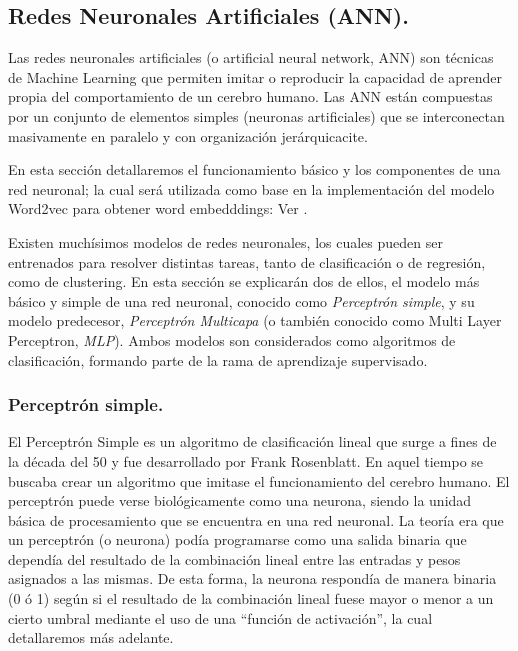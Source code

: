 \documentclass[12pt,a4paper]{article}
\begin{document}
\begin{sloppypar}
\cleardoublepage
\subsection{Redes Neuronales Artificiales (ANN).}\label{ann_teoria}

Las redes neuronales artificiales (o artificial neural network, ANN) son técnicas de Machine Learning que permiten imitar o reproducir la capacidad de aprender propia del comportamiento de un cerebro humano. Las ANN están compuestas por un conjunto de elementos simples (neuronas artificiales) que se interconectan masivamente en paralelo y con organización jerárquicacite\cite{ANN_21}.

En esta sección detallaremos el funcionamiento básico y los componentes de una red neuronal; la cual será utilizada como base en la implementación del modelo Word2vec para obtener word embedddings: Ver \textit{}.

Existen muchísimos modelos de redes neuronales, los cuales pueden ser entrenados para resolver distintas tareas, tanto de clasificación o de regresión, como de clustering. En esta sección se explicarán dos de ellos, el modelo más básico y simple de una red neuronal, conocido como \textit{Perceptrón simple}, y su modelo predecesor, \textit{Perceptrón Multicapa} (o también conocido como Multi Layer Perceptron, \textit{MLP}). Ambos modelos son considerados como algoritmos de clasificación, formando parte de la rama de aprendizaje supervisado.

\subsubsection{Perceptrón simple.}

El Perceptrón Simple es un algoritmo de clasificación lineal que surge a fines de la década del 50 y fue desarrollado por Frank Rosenblatt. En aquel tiempo se buscaba crear un algoritmo que imitase el funcionamiento del cerebro humano. El perceptrón puede verse biológicamente como una neurona, siendo la unidad básica de procesamiento que se encuentra en una red neuronal. La teoría era que un perceptrón (o neurona) podía programarse como una salida binaria que dependía del resultado de la combinación lineal entre las entradas y pesos asignados a las mismas. De esta forma, la neurona respondía de manera binaria (0 ó 1) según si el resultado de la combinación lineal fuese mayor o menor a un cierto umbral mediante el uso de una “función de activación”\cite{apunte_uba}, la cual detallaremos más adelante.


\end{sloppypar}
\end{document}
